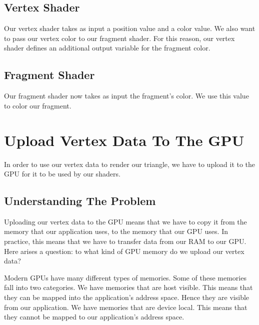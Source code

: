 \subsection{Vertex Shader}

Our vertex shader takes as input a position value and a color value.
We also want to pass our vertex color to our fragment shader.
For this reason, our vertex shader defines an additional output variable for
the fragment color.

\begin{minipage}{\linewidth}{\noindent}
    
\end{minipage}

\subsection{Fragment Shader}

Our fragment shader now takes as input the fragment's color.
We use this value to color our fragment.

\begin{minipage}{\linewidth}{\noindent}
    
\end{minipage}

\section{Upload Vertex Data To The GPU}

In order to use our vertex data to render our triangle, we have to upload it
to the GPU for it to be used by our shaders.

\subsection{Understanding The Problem}

Uploading our vertex data to the GPU means that we have to copy it
from the memory that our application uses, to the memory that our GPU uses.
In practice, this means that we have to transfer data from our RAM to our GPU.
Here arises a question: to what kind of GPU memory do we upload
our vertex data?

Modern GPUs have many different types of memories.
Some of these memories fall into two categories.
We have memories that are host visible.
This means that they can be mapped into the application's address space.
Hence they are visible from our application.
We have memories that are device local.
This means that they cannot be mapped to our application's address space.

